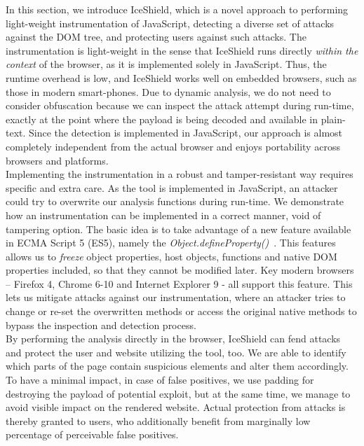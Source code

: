   In this section, we introduce IceShield, which is a novel approach to performing light-weight instrumentation of JavaScript, detecting a diverse set of attacks against the DOM tree, and protecting users against such attacks. The instrumentation is light-weight in the sense that IceShield runs directly \emph{within the context} of the browser, as it is implemented solely in JavaScript. Thus, the runtime overhead is low, and IceShield works well on embedded browsers, such as those in modern smart-phones. Due to dynamic analysis, we do not need to consider obfuscation because we can inspect the attack attempt during run-time, exactly at the point where the payload is being decoded and available in plain-text. Since the detection is implemented in JavaScript, our approach is almost completely independent from the actual browser and enjoys portability across browsers and platforms.\\

  Implementing the instrumentation in a robust and tamper-resistant way requires specific and extra care. As the tool is implemented in JavaScript, an attacker could try to overwrite our analysis functions during run-time. We demonstrate how an instrumentation can be implemented in a correct manner, void of tampering option. The basic idea is to take advantage of a new feature available in ECMA Script 5 (ES5), namely the \textit{Object.defineProperty()}~\cite{_defineproperty_????}. This features allows us to \emph{freeze} object properties, host objects, functions and native DOM properties included, so that they cannot be modified later. Key modern browsers -- Firefox 4, Chrome 6-10 and Internet Explorer 9 - all support this feature. This lets us mitigate attacks against our instrumentation, where an attacker tries to change or re-set the overwritten methods or access the original native methods to bypass the inspection and detection process. \\

  By performing the analysis directly in the browser, IceShield can fend attacks and protect the user and website utilizing the tool, too. We are able to identify which parts of the page contain suspicious elements and alter them accordingly. To have a minimal impact, in case of false positives, we use padding for destroying the payload of potential exploit, but at the same time, we manage to avoid visible impact on the rendered website. Actual protection from attacks is thereby granted to users, who additionally benefit from marginally low percentage of perceivable false positives.\\

